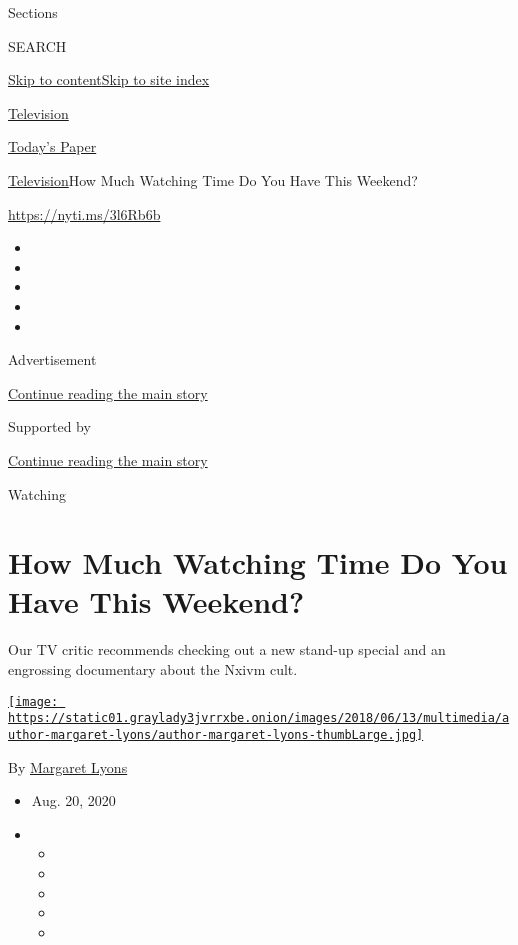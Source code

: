 Sections

SEARCH

\protect\hyperlink{site-content}{Skip to
content}\protect\hyperlink{site-index}{Skip to site index}

\href{https://www.nytimes3xbfgragh.onion/section/arts/television}{Television}

\href{https://myaccount.nytimes3xbfgragh.onion/auth/login?response_type=cookie\&client_id=vi}{}

\href{https://www.nytimes3xbfgragh.onion/section/todayspaper}{Today's
Paper}

\href{/section/arts/television}{Television}\textbar{}How Much Watching
Time Do You Have This Weekend?

\url{https://nyti.ms/3l6Rb6b}

\begin{itemize}
\item
\item
\item
\item
\item
\end{itemize}

Advertisement

\protect\hyperlink{after-top}{Continue reading the main story}

Supported by

\protect\hyperlink{after-sponsor}{Continue reading the main story}

Watching

\hypertarget{how-much-watching-time-do-you-have-this-weekend}{%
\section{How Much Watching Time Do You Have This
Weekend?}\label{how-much-watching-time-do-you-have-this-weekend}}

Our TV critic recommends checking out a new stand-up special and an
engrossing documentary about the Nxivm cult.

\href{https://www.nytimes3xbfgragh.onion/by/margaret-lyons}{\texttt{[image: https://static01.graylady3jvrrxbe.onion/images/2018/06/13/multimedia/author-margaret-lyons/author-margaret-lyons-thumbLarge.jpg]}}

By \href{https://www.nytimes3xbfgragh.onion/by/margaret-lyons}{Margaret
Lyons}

\begin{itemize}
\item
  Aug. 20, 2020
\item
  \begin{itemize}
  \item
  \item
  \item
  \item
  \item
  \end{itemize}
\end{itemize}

